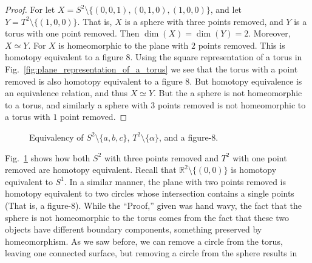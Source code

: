 \documentclass[crop=false,class=book,oneside]{standalone}                      %
\begin{document}
            \begin{proof}
                For let $X=S^{2}\setminus\{(0,0,1),(0,1,0),(1,0,0)\}$, and let
                $Y=T^{2}\setminus\{(1,0,0)\}$. That is, $X$ is a sphere with
                three points removed, and $Y$ is a torus with one point removed.
                Then $\dim(X)=\dim(Y)=2$. Moreover, $X\simeq Y$. For $X$ is
                homeomorphic to the plane with $2$ points removed. This is
                homotopy equivalent to a figure $8$. Using the square
                representation of a torus in
                Fig.~\ref{fig:plane_representation_of_a_torus} we see that the
                torus with a point removed is also homotopy equivalent to a
                figure $8$. But homotopy equivalence is an equivalence relation,
                and thus $X\simeq Y$. But the a sphere is not homeomorphic to a
                torus, and similarly a sphere with $3$ points removed is not
                homeomorphic to a torus with $1$ point removed.
            \end{proof}
            \begin{figure}[H]
                    \centering
                    \captionsetup{type=figure}
                    \resizebox{\textwidth}{!}{%
                    }
                    \caption{Equivalency of $S^{2}\setminus\{a,b,c\}$,
                             $T^{2}\setminus\{\alpha\}$, and a figure-8.}
                    \label{fig:homotopy_equivalence_sphere_%
                           with_3_holes_torus_with_1_hole}
            \end{figure} 
            Fig.~\ref{fig:homotopy_equivalence_sphere_%
                           with_3_holes_torus_with_1_hole} shows how both
            $S^{2}$ with three points removed and $T^{2}$ with one point removed
            are homotopy equivalent. Recall that
            $\mathbb{R}^{2}\setminus \{(0,0)\}$ is homotopy equivalent to
            $S^{1}$. In a similar manner, the plane with two points removed is
            homotopy equivalent to two circles whose intersection contains a
            single points (That is, a figure-$8$). While the ``Proof,'' given
            was hand wavy, the fact that the sphere is not homeomorphic to the
            torus comes from the fact that these two objects have different
            boundary components, something preserved by homeomorphism. As we
            saw before, we can remove a circle from the torus, leaving one
            connected surface, but removing a circle from the sphere results in 
\end{document}
